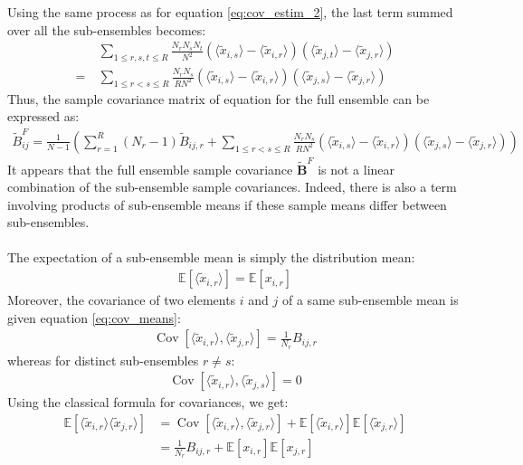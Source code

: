 \documentclass[12pt]{scrartcl}
\DeclareMathOperator{\Cov}{Cov}
\begin{document}
Using the same process as for equation \eqref{eq:cov_estim_2}, the last term summed over all the sub-ensembles becomes:
\begin{align}
& \sum_{1 \le r,s,t \le R} \frac{N_r N_s N_t}{N^2} \left(\langle \widetilde{x}_{i,s} \rangle - \langle \widetilde{x}_{i,r} \rangle \right) \left(\langle \widetilde{x}_{j,t} \rangle - \langle \widetilde{x}_{j,r} \rangle \right) \nonumber \\
= \ & \sum_{1 \le r < s \le R} \frac{N_r N_s}{R N^2} \left(\langle \widetilde{x}_{i,s} \rangle - \langle \widetilde{x}_{i,r} \rangle \right) \left(\langle \widetilde{x}_{j,s} \rangle - \langle \widetilde{x}_{j,r} \rangle \right)
\end{align}
Thus, the sample covariance matrix of equation for the full ensemble can be expressed as:
\begin{align}
\widetilde{B}^F_{ij} =  \frac{1}{N-1} \left(\sum_{r=1}^R \left(N_r-1\right) \widetilde{B}_{ij,r} + \sum_{1 \le r < s \le R} \frac{N_r N_s}{R N^2} \left(\langle \widetilde{x}_{i,s} \rangle - \langle \widetilde{x}_{i,r} \rangle \right) \left(\langle \widetilde{x}_{j,s} \rangle - \langle \widetilde{x}_{j,r} \rangle \right) \right)
\end{align}
It appears that the full ensemble sample covariance $\widetilde{\mathbf{B}}^F$ is not a linear combination of the sub-ensemble sample covariances. Indeed, there is also a term involving products of sub-ensemble means if these sample means differ between sub-ensembles.\\
$  $\\
The expectation of a sub-ensemble mean is simply the distribution mean:
\begin{align}
\mathbb{E} \left[\langle \widetilde{x}_{i,r} \rangle \right] = \mathbb{E} \left[x_{i,r} \right]
\end{align}
Moreover, the covariance of two elements $i$ and $j$ of a same sub-ensemble mean is given equation \ref{eq:cov_means}:
\begin{align}
\Cov \left[\langle \widetilde{x}_{i,r} \rangle,\langle \widetilde{x}_{j,r} \rangle \right] = \frac{1}{N_r} B_{ij,r}
\end{align}
whereas for distinct sub-ensembles $r \ne s$:
\begin{align}
\Cov \left[\langle \widetilde{x}_{i,r} \rangle,\langle \widetilde{x}_{j,s} \rangle \right] = 0
\end{align}
Using the classical formula for covariances, we get:
\begin{align}
\mathbb{E} \left[\langle \widetilde{x}_{i,r} \rangle \langle \widetilde{x}_{j,r} \rangle\right] & = \Cov \left[\langle \widetilde{x}_{i,r} \rangle,\langle \widetilde{x}_{j,r} \rangle \right] + \mathbb{E} \left[\langle \widetilde{x}_{i,r} \rangle \right] \mathbb{E} \left[ \langle \widetilde{x}_{j,r} \rangle\right] \nonumber \\
& = \frac{1}{N_r} B_{ij,r} + \mathbb{E} \left[x_{i,r} \right] \mathbb{E} \left[x_{j,r} \right]
\end{align}
\end{document}
